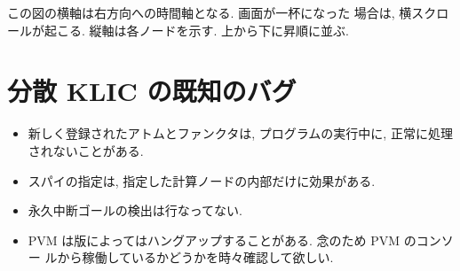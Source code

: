 \documentclass[a4,titlepage]{jsreport}
\begin{document}
この図の横軸は右方向への時間軸となる.  画面が一杯になった
場合は, 横スクロールが起こる.  縦軸は各ノードを示す.  
上から下に昇順に並ぶ.

\section{分散 KLIC の既知のバグ}
\begin{itemize}
\item
新しく登録されたアトムとファンクタは, プログラムの実行中に, 正常に処理
されないことがある.  

\item
スパイの指定は, 
指定した計算ノードの内部だけに効果がある.  

\item
永久中断ゴールの検出は行なってない.

\item
PVM は版によってはハングアップすることがある. 念のため PVM のコンソー
ルから稼働しているかどうかを時々確認して欲しい.

\end{itemize}
\end{document}
